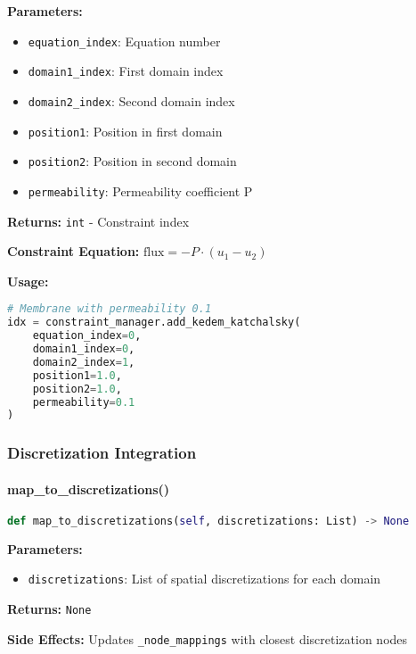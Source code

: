 \textbf{Parameters:}
\begin{itemize}
    \item \texttt{equation\_index}: Equation number
    \item \texttt{domain1\_index}: First domain index
    \item \texttt{domain2\_index}: Second domain index
    \item \texttt{position1}: Position in first domain
    \item \texttt{position2}: Position in second domain
    \item \texttt{permeability}: Permeability coefficient P
\end{itemize}

\textbf{Returns:} \texttt{int} - Constraint index

\textbf{Constraint Equation:} $\text{flux} = -P \cdot (u_1 - u_2)$

\textbf{Usage:}
\begin{lstlisting}[language=Python, caption=Add Kedem-Katchalsky Usage]
# Membrane with permeability 0.1
idx = constraint_manager.add_kedem_katchalsky(
    equation_index=0,
    domain1_index=0,
    domain2_index=1, 
    position1=1.0,
    position2=1.0,
    permeability=0.1
)
\end{lstlisting}

\subsubsection{Discretization Integration}

\paragraph{map\_to\_discretizations()}\leavevmode
\begin{lstlisting}[language=Python, caption=Map to Discretizations Method]
def map_to_discretizations(self, discretizations: List) -> None
\end{lstlisting}

\textbf{Parameters:}
\begin{itemize}
    \item \texttt{discretizations}: List of spatial discretizations for each domain
\end{itemize}

\textbf{Returns:} \texttt{None}

\textbf{Side Effects:} Updates \texttt{\_node\_mappings} with closest discretization nodes

